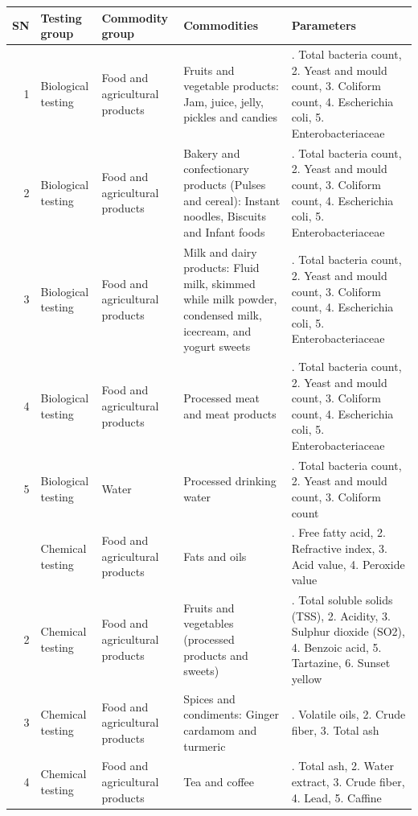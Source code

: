 \documentclass[
  openany]{book}
\begin{document}
\begin{longtable}{r>{\raggedright\arraybackslash}p{8em}>{\raggedright\arraybackslash}p{8em}>{\raggedright\arraybackslash}p{10em}>{\raggedright\arraybackslash}p{22em}}
\toprule
SN & Testing group & Commodity group & Commodities & Parameters\\
\midrule
\rowcolor{gray!6}  1 & Biological testing & Food and agricultural products & Fruits and vegetable products: Jam, juice, jelly, pickles and candies & 1. Total bacteria count, 2. Yeast and mould count, 3. Coliform count, 4. Escherichia coli, 5. Enterobacteriaceae\\
2 & Biological testing & Food and agricultural products & Bakery and confectionary products (Pulses and cereal): Instant noodles, Biscuits and Infant foods & 1. Total bacteria count, 2. Yeast and mould count, 3. Coliform count, 4. Escherichia coli, 5. Enterobacteriaceae\\
\rowcolor{gray!6}  3 & Biological testing & Food and agricultural products & Milk and dairy products: Fluid milk, skimmed while milk powder, condensed milk, icecream, and yogurt sweets & 1. Total bacteria count, 2. Yeast and mould count, 3. Coliform count, 4. Escherichia coli, 5. Enterobacteriaceae\\
4 & Biological testing & Food and agricultural products & Processed meat and meat products & 1. Total bacteria count, 2. Yeast and mould count, 3. Coliform count, 4. Escherichia coli, 5. Enterobacteriaceae\\
\rowcolor{gray!6}  5 & Biological testing & Water & Processed drinking water & 1. Total bacteria count, 2. Yeast and mould count, 3. Coliform count\\
\addlinespace
1 & Chemical testing & Food and agricultural products & Fats and oils & 1. Free fatty acid, 2. Refractive index, 3. Acid value, 4. Peroxide value\\
\rowcolor{gray!6}  2 & Chemical testing & Food and agricultural products & Fruits and vegetables (processed products and sweets) & 1. Total soluble solids (TSS), 2. Acidity, 3. Sulphur dioxide (SO2), 4. Benzoic acid, 5. Tartazine, 6. Sunset yellow\\
3 & Chemical testing & Food and agricultural products & Spices and condiments: Ginger cardamom and turmeric & 1. Volatile oils, 2. Crude fiber, 3. Total ash\\
\rowcolor{gray!6}  4 & Chemical testing & Food and agricultural products & Tea and coffee & 1. Total ash, 2. Water extract, 3. Crude fiber, 4. Lead, 5. Caffine\\

\end{longtable}
\end{document}
